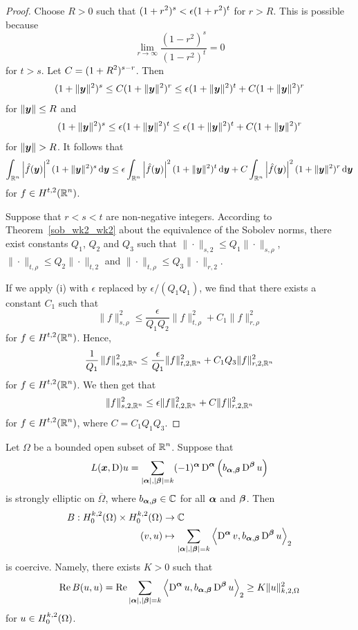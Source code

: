 \begin{proof}
 Choose $R>0$ such that
$\displaystyle (1+r^2)^s < \epsilon (1+r^2)^t$ for $r> R$.
This is possible because
\[
\lim_{r\rightarrow \infty} \frac{(1-r^2)^s}{(1-r^2)^t} = 0
\]
for $t>s$.  Let $\displaystyle C= (1+R^2)^{s-r}$.  Then
\[
(1+\|{\bm{y}}\|^2)^s \leq C (1+\|{\bm{y}}\|^2)^r \leq
\epsilon (1+\|{\bm{y}}\|^2)^t + C (1+\|{\bm{y}}\|^2)^r
\]
for $\|{\bm{y}}\|\leq R$ and
\[
(1+\|{\bm{y}}\|^2)^s \leq \epsilon (1+\|{\bm{y}}\|^2)^t \leq
\epsilon (1+\|{\bm{y}}\|^2)^t + C (1+\|{\bm{y}}\|^2)^r
\]
for $\|\VEC{y}\|> R$.  It follows that
\[
\int_{\mathbb{R}^n} \left|\hat{f}({\bm{y}})\right|^2 (1+\|{\bm{y}}\|^2)^s \,\mathrm{d}{{\bm{y}}}
\leq \epsilon \int_{\mathbb{R}^n} \left|\hat{f}({\bm{y}})\right|^2
(1+\|{\bm{y}}\|^2)^t \,\mathrm{d}{{\bm{y}}}
+ C \int_{\mathbb{R}^n} \left|\hat{f}({\bm{y}})\right|^2
(1+\|{\bm{y}}\|^2)^r \,\mathrm{d}{{\bm{y}}}
\]
for $\displaystyle f \in H^{t,2}(\mathbb{R}^n)$.

  Suppose that $r<s<t$ are non-negative integers.
According to Theorem~\ref{sob_wk2_wk2} about the equivalence of the
Sobolev norms, there exist constants $Q_1$, $Q_2$ and $Q_3$ such that
$\|\cdot\|_{s,2} \leq Q_1 \|\cdot\|_{s,\rho}$,
$\|\cdot\|_{t,\rho} \leq Q_2 \|\cdot\|_{t,2}$ and
$\|\cdot\|_{t,\rho} \leq Q_3 \|\cdot\|_{r,2}$.

If we apply (i) with $\epsilon$ replaced by $\epsilon/(Q_1 Q_1)$, we
find that there exists a constant $C_1$ such that
\[
\|f\|_{s,\rho}^2 \leq \frac{\epsilon}{Q_1 Q_2} \| f\|_{t,\rho}^2
+ C_1 \| f \|_{r,\rho}^2
\]
for $\displaystyle f \in H^{t,2}(\mathbb{R}^n)$.  Hence,
\[
\frac{1}{Q_1}\, \|f\|_{s,2,\mathbb{R}^n}^2 \leq \frac{\epsilon}{Q_1}
\| f\|_{t,2,\mathbb{R}^n}^2 + C_1 Q_3 \| f \|_{r,2,\mathbb{R}^n}^2
\]
for $\displaystyle f \in H^{t,2}(\mathbb{R}^n)$.  We then get that
\[
\|f\|_{s,2,\mathbb{R}^n}^2 \leq \epsilon \| f\|_{t,2,\mathbb{R}^n}^2 + C \| f \|_{r,2,\mathbb{R}^n}^2
\]
for $\displaystyle f \in H^{t,2}(\mathbb{R}^n)$, where $C= C_1 Q_1 Q_3$.
\end{proof}

\begin{lemma} \label{ell_garding2}
Let $\Omega$ be a bounded open subset of $\displaystyle \mathbb{R}^n$.  Suppose that
\[
L({\bm{x}},\operatorname{D})u = \sum_{|{\bm{\alpha}}|,|{\bm{\beta}}|= k} (-1)^{{\bm{\alpha}}}
\operatorname{D}^{{\bm{\alpha}}} \left( b_{{\bm{\alpha}},{\bm{\beta}}}
\operatorname{D}^{{\bm{\beta}}} u\right)
\]
is strongly elliptic on $\overline{\Omega}$, where
$b_{{\bm{\alpha}},{\bm{\beta}}} \in \mathbb{C}$ for all ${\bm{\alpha}}$ and
${\bm{\beta}}$.  Then
\[
\begin{split}
B : H^{k,2}_0(\Omega) \times H^{k,2}_0(\Omega) & \rightarrow \mathbb{C} \\
(v,u) &\mapsto
\sum_{|{\bm{\alpha}}|,|{\bm{\beta}}|= k}
\left\langle{\operatorname{D}^{{\bm{\alpha}}} v} , {b_{{\bm{\alpha}},{\bm{\beta}}} \operatorname{D}^{{\bm{\beta}}} u}\right\rangle_2
\end{split}
\]
is coercive.  Namely, there exists $K>0$ such that
\[
\operatorname{Re} B(u,u) = \operatorname{Re} \sum_{|{\bm{\alpha}}|,|{\bm{\beta}}|= k}
\left\langle{\operatorname{D}^{{\bm{\alpha}}} u} , {b_{{\bm{\alpha}},{\bm{\beta}}}
\operatorname{D}^{{\bm{\beta}}} u}\right\rangle_2 \geq K \|u\|_{k,2,\Omega}^2
\]
for $\displaystyle u  \in H^{k,2}_0(\Omega)$.
\end{lemma}

